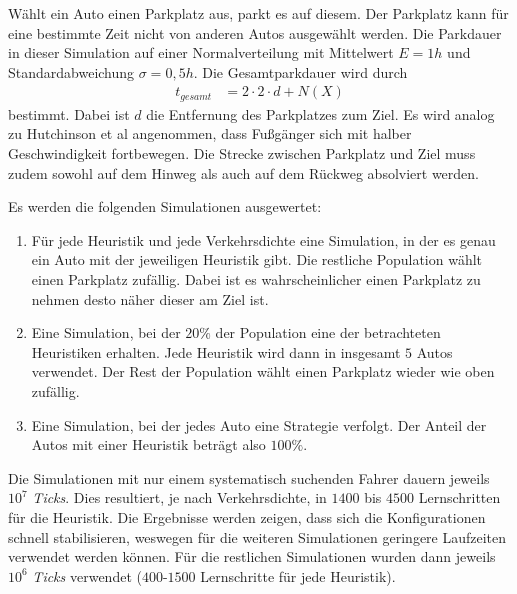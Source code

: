 Wählt ein Auto einen Parkplatz aus, parkt es auf diesem. Der Parkplatz kann für eine bestimmte Zeit nicht von anderen Autos ausgewählt werden. Die Parkdauer in dieser Simulation auf einer Normalverteilung mit Mittelwert $E=1h$ und Standardabweichung $\sigma = 0,5h$. Die Gesamtparkdauer wird durch 
\begin{align}
t_{gesamt} &= 2\cdot 2\cdot d + N(X)
\end{align}
bestimmt. Dabei ist $d$ die Entfernung des Parkplatzes zum Ziel. Es wird analog zu Hutchinson et al angenommen, dass Fußgänger sich mit halber Geschwindigkeit fortbewegen. Die Strecke zwischen Parkplatz und Ziel muss zudem sowohl auf dem Hinweg als auch auf dem Rückweg absolviert werden.

Es werden die folgenden Simulationen ausgewertet:
\begin{enumerate}
	\item Für jede Heuristik und jede Verkehrsdichte eine Simulation, in der es genau ein Auto mit der jeweiligen Heuristik gibt. Die restliche Population wählt einen Parkplatz zufällig. Dabei ist es wahrscheinlicher einen Parkplatz zu nehmen desto näher dieser am Ziel ist.
	\item Eine Simulation, bei der $20\%$ der Population eine der betrachteten Heuristiken erhalten. Jede Heuristik wird dann in insgesamt $5$ Autos verwendet. Der Rest der Population wählt einen Parkplatz wieder wie oben zufällig. 
	\item Eine Simulation, bei der jedes Auto eine Strategie verfolgt. Der Anteil der Autos mit einer Heuristik beträgt also $100\%$.
\end{enumerate}
Die Simulationen mit nur einem systematisch suchenden Fahrer dauern jeweils $10^7$ \emph{Ticks}. Dies resultiert, je nach Verkehrsdichte, in $1400$ bis $4500$ Lernschritten für die Heuristik. Die Ergebnisse werden zeigen, dass sich die Konfigurationen schnell stabilisieren, weswegen für die weiteren Simulationen geringere Laufzeiten verwendet werden können. Für die restlichen Simulationen wurden dann jeweils $10^6$ \emph{Ticks} verwendet ($400$-$1500$ Lernschritte für jede Heuristik).